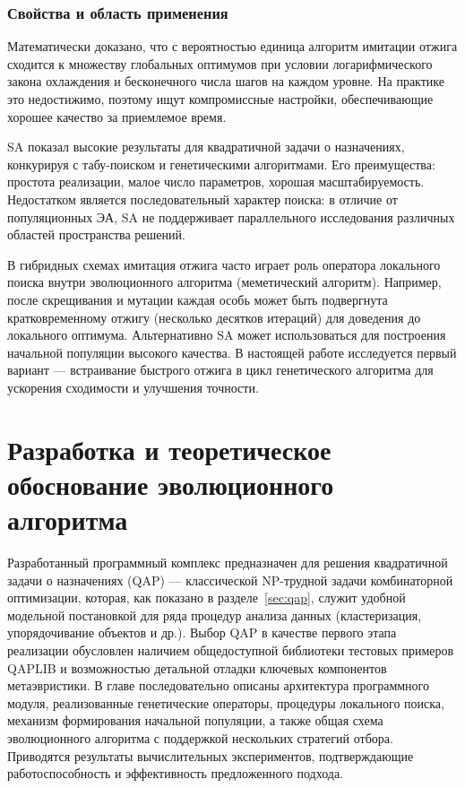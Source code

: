 \documentclass[732]{studrep}
\theoremstyle{nonumberplain}
\begin{document}
\subsection{Свойства и область применения}

Математически доказано, что с вероятностью единица алгоритм имитации отжига сходится к множеству глобальных оптимумов при условии логарифмического закона охлаждения и бесконечного числа шагов на каждом уровне. На практике это недостижимо, поэтому ищут компромиссные настройки, обеспечивающие хорошее качество за приемлемое время.

SA показал высокие результаты для квадратичной задачи о назначениях, конкурируя с табу-поиском и генетическими алгоритмами. Его преимущества: простота реализации, малое число параметров, хорошая масштабируемость. Недостатком является последовательный характер поиска: в отличие от популяционных ЭА, SA не поддерживает параллельного исследования различных областей пространства решений.

В гибридных схемах имитация отжига часто играет роль оператора локального поиска внутри эволюционного алгоритма (меметический алгоритм). Например, после скрещивания и мутации каждая особь может быть подвергнута кратковременному отжигу (несколько десятков итераций) для доведения до локального оптимума. Альтернативно SA может использоваться для построения начальной популяции высокого качества. В настоящей работе исследуется первый вариант — встраивание быстрого отжига в цикл генетического алгоритма для ускорения сходимости и улучшения точности.


\chapter{Разработка и теоретическое обоснование эволюционного алгоритма}
\label{chap:implementation}

Разработанный программный комплекс предназначен для решения квадратичной задачи о назначениях (QAP) — классической NP-трудной задачи комбинаторной оптимизации, которая, как показано в разделе~\ref{sec:qap}, служит удобной модельной постановкой для ряда процедур анализа данных (кластеризация, упорядочивание объектов и др.). Выбор QAP в качестве первого этапа реализации обусловлен наличием общедоступной библиотеки тестовых примеров QAPLIB и возможностью детальной отладки ключевых компонентов метаэвристики. В главе последовательно описаны архитектура программного модуля, реализованные генетические операторы, процедуры локального поиска, механизм формирования начальной популяции, а также общая схема эволюционного алгоритма с поддержкой нескольких стратегий отбора. Приводятся результаты вычислительных экспериментов, подтверждающие работоспособность и эффективность предложенного подхода.
\end{document}
